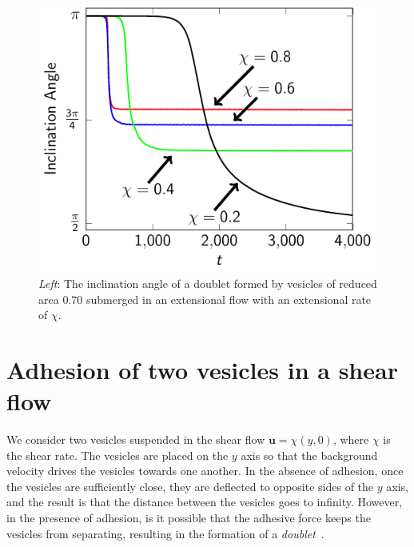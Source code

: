 \documentclass[prf,superscriptaddress,showpacs]{revtex4-1}
\newcommand{\uu}{\mathbf{u}}
\begin{document}
\begin{figure}[htp]
  \begin{minipage}{0.45\textwidth}
  \centering
  \includegraphics[width=\textwidth]{figs/adR4em1adS7em1_ra070_inclinationAngle.pdf}
  \end{minipage}
  \hfill
  \begin{minipage}{0.45\textwidth}
  \end{minipage}
  \caption{\label{fig:extensionalInclinationAngle} {\em Left}: The
  inclination angle of a doublet formed by vesicles of reduced area
  $0.70$ submerged in an extensional flow with an extensional rate of
  $\chi$.}
\end{figure}


\section{Adhesion of two vesicles in a shear flow}
\label{sec:sflow} 
We consider two vesicles suspended in the shear flow $\uu = \chi(y,0)$,
where $\chi$ is the shear rate.  The vesicles are placed on the $y$ axis
so that the background velocity drives the vesicles towards one another.
In the absence of adhesion, once the vesicles are sufficiently close,
they are deflected to opposite sides of the $y$ axis, and the result is
that the distance between the vesicles goes to infinity.  However, in
the presence of adhesion, is it possible that the adhesive force keeps
the vesicles from separating, resulting in the formation of a {\em
doublet}~\cite{}.
\end{document}
